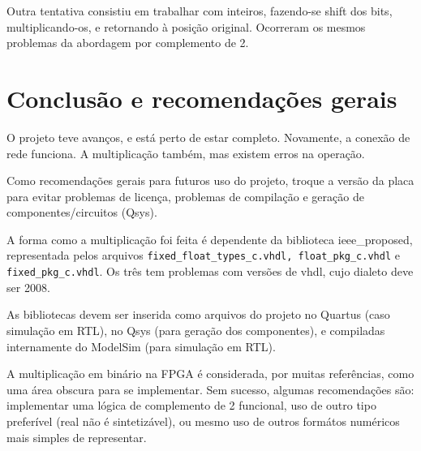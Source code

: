 \documentclass [12pt,oneside] {article}
\begin{document}
	Outra tentativa consistiu em trabalhar com inteiros,
fazendo-se shift dos bits, multiplicando-os, e retornando à posição
original. Ocorreram os mesmos problemas da abordagem por complemento
de 2.


\section{Conclusão e recomendações gerais}

	O projeto teve avanços, e está perto de estar completo.
Novamente, a conexão de rede funciona. A multiplicação também, mas existem erros na
operação.

	Como recomendações gerais para futuros uso do projeto, troque
a versão da placa para evitar problemas de licença, problemas de
compilação e geração de componentes/circuitos (Qsys).

	A forma como a multiplicação foi feita é dependente da
biblioteca ieee\_proposed, representada pelos arquivos
\texttt{fixed\_float\_types\_c.vhdl, float\_pkg\_c.vhdl} e
\texttt{fixed\_pkg\_c.vhdl}. Os três tem problemas com versões de
vhdl, cujo dialeto deve ser 2008.

	As bibliotecas devem ser inserida como arquivos do projeto no
Quartus (caso simulação em RTL), no Qsys (para geração dos
componentes), e compiladas internamente do ModelSim (para simulação em
RTL).

	A multiplicação em binário na FPGA é considerada, por muitas
referências, como uma área obscura para se implementar. Sem sucesso,
algumas recomendações são: implementar uma lógica de complemento de 2
funcional, uso de outro tipo preferível (real não é sintetizável), ou
mesmo uso de outros formátos numéricos mais simples de representar.
\end{document}
